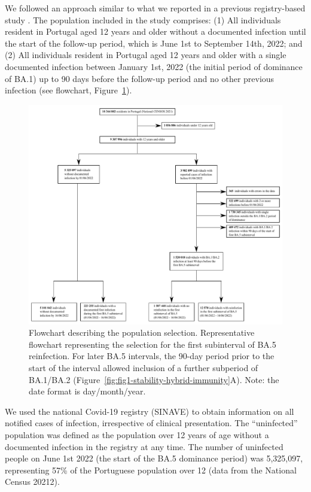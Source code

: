 We followed an approach similar to what we reported in a previous registry-based study \citep{malatoRiskBAInfection2022}. The population included in the study comprises: (1) All individuals resident in Portugal aged 12 years and older without a documented infection until the start of the follow-up period, which is June 1st to September 14th, 2022; and (2) All individuals resident in Portugal aged 12 years and older with a single documented infection between January 1st, 2022 (the initial period of dominance of BA.1) up to 90 days before the follow-up period and no other previous infection (see flowchart, Figure~\ref{fig:covid19-02-flowchart}).

\begin{figure}[h]
    \centering
    \includegraphics[width=0.91\linewidth]{chapter/2023-covid19-02/figures/ba5-1st-subvariant_risk_population-flow-chart_09.pdf}
    \caption[Flowchart describing the population selection]{Flowchart describing the population selection. Representative flowchart representing the selection for the first subinterval of BA.5 reinfection. For later BA.5 intervals, the 90-day period prior to the start of the interval allowed inclusion of a further subperiod of BA.1/BA.2 (Figure~\ref{fig:fig1-stability-hybrid-immunity}A). Note: the date format is day/month/year.}
    \label{fig:covid19-02-flowchart}
\end{figure}

We used the national Covid-19 registry (SINAVE) to obtain information on all notified cases of infection, irrespective of clinical presentation. The ``uninfected'' population was defined as the population over 12 years of age without a documented infection in the registry at any time. The number of uninfected people on June 1st 2022 (the start of the BA.5 dominance period) was 5,325,097, representing 57\% of the Portuguese population over 12 (data from the National Census 20212).

